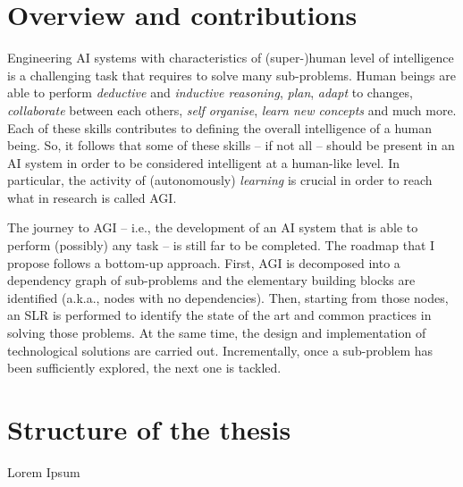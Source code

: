 \begin{refsection}
\section{Overview and contributions}
\label{sec:overview-and-contributions}
%
Engineering \ac{AI} systems with characteristics of (super-)human level of intelligence is a challenging task that requires to solve many sub-problems.
%
Human beings are able to perform \emph{deductive} and \emph{inductive reasoning}, \emph{plan}, \emph{adapt} to changes, \emph{collaborate} between each others, \emph{self organise}, \emph{learn new concepts} and much more.
%
Each of these skills contributes to defining the overall intelligence of a human being.
%
So, it follows that some of these skills -- if not all -- should be present in an \ac{AI} system in order to be considered intelligent at a human-like level.
%
In particular, the activity of (autonomously) \emph{learning} is crucial in order to reach what in research is called \ac{AGI}.

The journey to \ac{AGI} -- i.e., the development of an \ac{AI} system that is able to perform (possibly) any task -- is still far to be completed.
%
The roadmap that I propose follows a bottom-up approach.
%
First, \ac{AGI} is decomposed into a dependency graph of sub-problems and the elementary building blocks are identified (a.k.a., nodes with no dependencies).
%
Then, starting from those nodes, an \ac{SLR} is performed to identify the state of the art and common practices in solving those problems.
%
At the same time, the design and implementation of technological solutions are carried out.
%
Incrementally, once a sub-problem has been sufficiently explored, the next one is tackled.



\section{Structure of the thesis}
\label{sec:structure-of-the-thesis}
%
Lorem Ipsum

\printbibliography[title=Reference,heading=bibintoc]

\end{refsection}